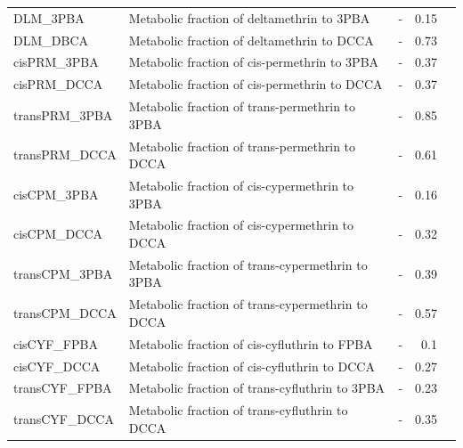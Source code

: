 \documentclass[toxics,article,submit,pdftex,moreauthors]{Definitions/mdpi}
\begin{document}
\begin{table}[H]
\begin{adjustwidth}{-4cm}{}
\begin{tabular}{lllrr}
DLM\_3PBA & Metabolic fraction of deltamethrin to 3PBA & - & 0.15 & \cite{quindroit2019estimating}\\
DLM\_DBCA & Metabolic fraction of deltamethrin to DCCA & - & 0.73 & \cite{quindroit2019estimating}\\
cisPRM\_3PBA & Metabolic fraction of cis-permethrin to 3PBA & - & 0.37 & \cite{quindroit2019estimating}\\
cisPRM\_DCCA & Metabolic fraction of cis-permethrin to DCCA & - & 0.37 & \cite{quindroit2019estimating}\\
transPRM\_3PBA & Metabolic fraction of trans-permethrin to 3PBA & - & 0.85 & \cite{quindroit2019estimating}\\
transPRM\_DCCA & Metabolic fraction of trans-permethrin to DCCA & - & 0.61 & \cite{quindroit2019estimating}\\
cisCPM\_3PBA & Metabolic fraction of cis-cypermethrin to 3PBA & - & 0.16 & \cite{quindroit2019estimating}\\
cisCPM\_DCCA & Metabolic fraction of cis-cypermethrin to DCCA & - & 0.32 & \cite{quindroit2019estimating}\\
transCPM\_3PBA & Metabolic fraction of trans-cypermethrin to 3PBA & - & 0.39 & \cite{quindroit2019estimating}\\
transCPM\_DCCA & Metabolic fraction of trans-cypermethrin to DCCA & - & 0.57 & \cite{quindroit2019estimating}\\
cisCYF\_FPBA & Metabolic fraction of cis-cyfluthrin to FPBA & - & 0.1 & \cite{quindroit2019estimating}\\
cisCYF\_DCCA & Metabolic fraction of cis-cyfluthrin to DCCA & - & 0.27 & \cite{quindroit2019estimating}\\
transCYF\_FPBA & Metabolic fraction of trans-cyfluthrin to 3PBA & - & 0.23 & \cite{quindroit2019estimating}\\
transCYF\_DCCA & Metabolic fraction of trans-cyfluthrin to DCCA & - & 0.35 & \cite{quindroit2019estimating}\\
\bottomrule
\end{tabular}
\end{adjustwidth}
\end{table}
\end{document}
